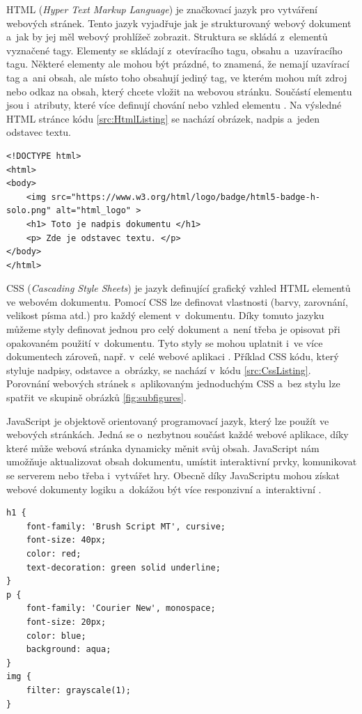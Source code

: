HTML (\emph{Hyper Text Markup Language}) je značkovací jazyk pro vytváření webových stránek. Tento jazyk vyjadřuje jak je strukturovaný webový dokument a~jak by jej měl webový prohlížeč zobrazit. Struktura se skládá z~elementů vyznačené tagy. Elementy se skládají z~otevíracího tagu, obsahu a~uzavíracího tagu. Některé elementy ale mohou být prázdné, to znamená, že nemají uzavírací tag a~ani obsah, ale místo toho obsahují jediný tag, ve kterém mohou mít zdroj nebo odkaz na obsah, který chcete vložit na webovou stránku. Součástí elementu jsou i~atributy, které více definují chování nebo vzhled elementu \cite{google-scholar-html}. Na výsledné HTML stránce kódu \ref{src:HtmlListing} se nachází obrázek, nadpis a~jeden odstavec textu.

\begin{lstlisting}[style=htmlcssjs,label=src:HtmlListing,caption={Příklad HTML kódu}]
<!DOCTYPE html>
<html>
<body>
    <img src="https://www.w3.org/html/logo/badge/html5-badge-h-solo.png" alt="html_logo" >
    <h1> Toto je nadpis dokumentu </h1>
    <p> Zde je odstavec textu. </p>
</body>
</html>
\end{lstlisting}

CSS (\emph{Cascading Style Sheets}) je jazyk definující grafický vzhled HTML elementů ve webovém dokumentu. Pomocí CSS lze definovat vlastnosti (barvy, zarovnání, velikost písma atd.) pro každý element v~dokumentu. Díky tomuto jazyku můžeme styly definovat jednou pro celý dokument a~není třeba je opisovat při opakovaném použití v~dokumentu. Tyto styly se mohou uplatnit i~ve více dokumentech zároveň, např. v~celé webové aplikaci \cite{google-scholar-css}. Příklad CSS kódu, který styluje nadpisy, odstavce a~obrázky, se nachází v~kódu \ref{src:CssListing}. Porovnání webových stránek s~aplikovaným jednoduchým CSS a~bez stylu lze spatřit ve skupině obrázků \ref{fig:subfigures}.

JavaScript je objektově orientovaný programovací jazyk, který lze použít ve webových stránkách. Jedná se o~nezbytnou součást každé webové aplikace, díky které může webová stránka dynamicky měnit svůj obsah. JavaScript nám umožňuje aktualizovat obsah dokumentu, umístit interaktivní prvky, komunikovat se serverem nebo třeba i~vytvářet hry. Obecně díky JavaScriptu mohou získat webové dokumenty logiku a~dokážou být více responzivní a~interaktivní \cite{google-scholar-js}.


\begin{lstlisting}[style=htmlcssjs,label=src:CssListing,caption={Příklad CSS kódu}]
h1 {
    font-family: 'Brush Script MT', cursive;
    font-size: 40px;
    color: red;
    text-decoration: green solid underline;
}
p {
    font-family: 'Courier New', monospace;
    font-size: 20px;
    color: blue;
    background: aqua;
}
img {
    filter: grayscale(1);
}
\end{lstlisting}


